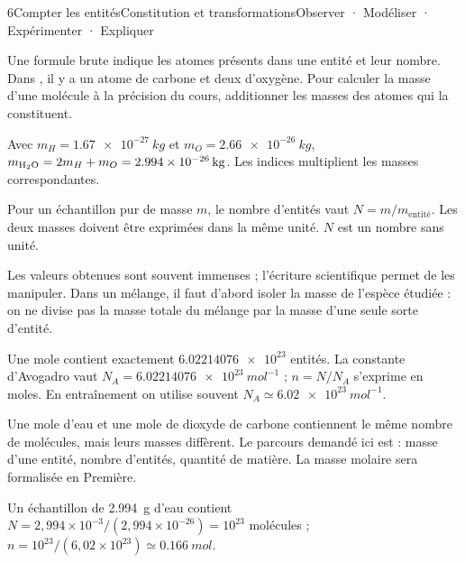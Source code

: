 \begin{ouverture}[mole]{6}{Compter les entités}{Constitution et transformations}{Observer · Modéliser · Expérimenter · Expliquer}
\end{ouverture}
\essentiel
{}
Une formule brute indique les atomes présents dans une entité et leur nombre. Dans , il y a un atome de carbone et deux d'oxygène. Pour calculer la masse d'une molécule à la précision du cours, additionner les masses des atomes qui la constituent.
\begin{exemple}Avec $m_H=\qty{1,67e-27}{kg}$ et $m_O=\qty{2,66e-26}{kg}$, $m_{\ce{H2O}}=2m_H+m_O=\qty{2,994e-26}{kg}$. Les indices multiplient les masses correspondantes.\end{exemple}
\begin{loi}Pour un échantillon pur de masse $m$, le nombre d'entités vaut $N=m/m_{\mathrm{entité}}$. Les deux masses doivent être exprimées dans la même unité. $N$ est un nombre sans unité.\end{loi}
Les valeurs obtenues sont souvent immenses ; l'écriture scientifique permet de les manipuler. Dans un mélange, il faut d'abord isoler la masse de l'espèce étudiée : on ne divise pas la masse totale du mélange par la masse d'une seule sorte d'entité.
\begin{definition}Une mole contient exactement $\num{6,02214076e23}$ entités. La constante d'Avogadro vaut $N_A=\qty{6,02214076e23}{mol^{-1}}$ ; $n=N/N_A$ s'exprime en moles. En entraînement on utilise souvent $N_A\simeq\qty{6,02e23}{mol^{-1}}$.\end{definition}
Une mole d'eau et une mole de dioxyde de carbone contiennent le même nombre de molécules, mais leurs masses diffèrent. Le parcours demandé ici est : masse d'une entité, nombre d'entités, quantité de matière. La masse molaire sera formalisée en Première.
\begin{exemple}Un échantillon de \qty{2,994}{g} d'eau contient $N=2,994\times10^{-3}/(2,994\times10^{-26})=10^{23}$ molécules ; $n=10^{23}/(6,02\times10^{23})\simeq\qty{0,166}{mol}$.\end{exemple}
